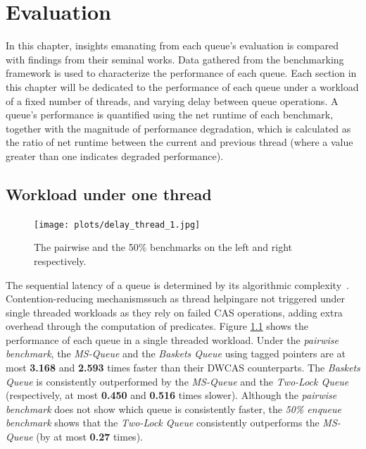 \chapter{Evaluation}
In this chapter, insights emanating from each queue's evaluation is compared
with findings from their seminal works. Data gathered from the benchmarking
framework is used to characterize the performance of each queue.
Each section in this chapter will be dedicated to the performance of each
queue under a workload of a fixed number of threads, and varying
delay between queue operations.
A queue's performance is quantified using the net runtime of each benchmark,
together with the magnitude of performance degradation, which is
calculated as the ratio of net runtime between the current and previous thread
(where a value greater than one indicates degraded performance).

\section{Workload under one thread}

\begin{figure}[!ht]
    \texttt{[image: plots/delay\_thread\_1.jpg]}
    \caption{The pairwise and the 50\% benchmarks on the left and right respectively.}
    \label{fig:perf_1_thread}
\end{figure}

The sequential latency of a queue is determined by its algorithmic
complexity~\citep{valois1995datastructures}. Contention-reducing
mechanisms\textemdash such as thread helping\textemdash are not triggered under
single threaded workloads as they rely on failed CAS operations, adding
extra overhead through the computation of predicates.
Figure \ref{fig:perf_1_thread} shows the performance of each queue in a single
threaded workload. Under the \emph{pairwise benchmark}, the \emph{MS-Queue} and
the \emph{Baskets Queue} using tagged pointers are at most \textbf{3.168} and
\textbf{2.593} times faster than their DWCAS counterparts. 
The \emph{Baskets Queue} is consistently outperformed by the \emph{MS-Queue}
and the \emph{Two-Lock Queue} (respectively, at most \textbf{0.450} and
\textbf{0.516} times slower). Although the \emph{pairwise benchmark} does not
show which queue is consistently faster, the \emph{50\% enqueue benchmark}
shows that the \emph{Two-Lock Queue} consistently outperforms the
\emph{MS-Queue} (by at most \textbf{0.27} times).

